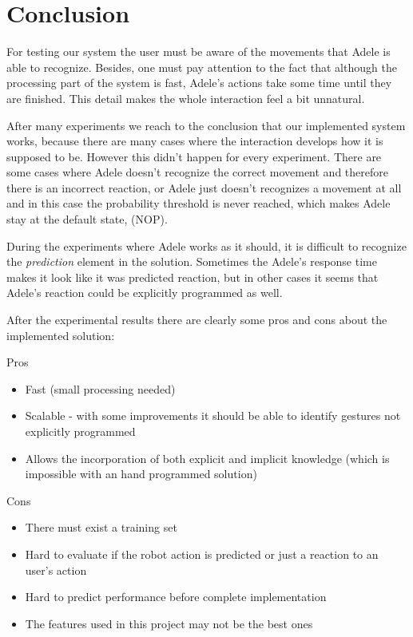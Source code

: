 \section{Conclusion}
For testing our system the user must be aware of the movements that Adele is able to recognize. Besides, one must pay attention to the fact that although the processing part of the system is fast, Adele's actions take some time until they are finished. This detail makes the whole interaction feel a bit unnatural.

After many experiments we reach to the conclusion that our implemented system works, because there are many cases where the interaction develops how it is supposed to be. However this didn't happen for every experiment. There are some cases where Adele doesn't recognize the correct movement and therefore there is an incorrect reaction, or Adele just doesn't recognizes a movement at all and in this case the probability threshold is never reached, which makes Adele stay at the default state, (NOP).

During the experiments where Adele works as it should, it is difficult to recognize the \textit{prediction} element in the solution. Sometimes the Adele's response time makes it look like it was predicted reaction, but in other cases it seems that Adele's reaction could be explicitly programmed as well.

After the experimental results there are clearly some pros and cons about the implemented solution:

\centerline{Pros}
\begin{itemize}
\item Fast (small processing needed)
\item Scalable - with some improvements it should be able to identify gestures not explicitly programmed
\item Allows the incorporation of both explicit and implicit knowledge (which is impossible with an hand programmed solution)
\end{itemize}

\centerline{Cons}
\begin{itemize}
\item There must exist a training set
\item Hard to evaluate if the robot action is predicted or just a reaction to an user's action
\item Hard to predict performance before complete implementation
\item The features used in this project may not be the best ones
\end{itemize}


